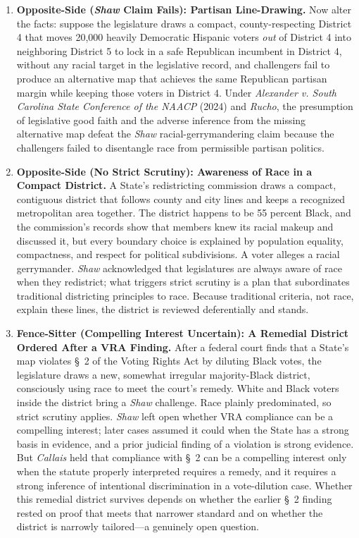 \documentclass[12pt]{article}
\begin{document}
\begin{enumerate}
\item \textbf{Opposite-Side (\textit{Shaw} Claim Fails): Partisan Line-Drawing.} Now alter the facts: suppose the legislature draws a compact, county-respecting District 4 that moves 20,000 heavily Democratic Hispanic voters \textit{out} of District 4 into neighboring District 5 to lock in a safe Republican incumbent in District 4, without any racial target in the legislative record, and challengers fail to produce an alternative map that achieves the same Republican partisan margin while keeping those voters in District 4. Under \textit{Alexander v. South Carolina State Conference of the NAACP} (2024) and \textit{Rucho}, the presumption of legislative good faith and the adverse inference from the missing alternative map defeat the \textit{Shaw} racial-gerrymandering claim because the challengers failed to disentangle race from permissible partisan politics.

\item \textbf{Opposite-Side (No Strict Scrutiny): Awareness of Race in a Compact District.} A State's redistricting commission draws a compact, contiguous district that follows county and city lines and keeps a recognized metropolitan area together. The district happens to be 55 percent Black, and the commission's records show that members knew its racial makeup and discussed it, but every boundary choice is explained by population equality, compactness, and respect for political subdivisions. A voter alleges a racial gerrymander. \textit{Shaw} acknowledged that legislatures are always aware of race when they redistrict; what triggers strict scrutiny is a plan that subordinates traditional districting principles to race. Because traditional criteria, not race, explain these lines, the district is reviewed deferentially and stands.

\item \textbf{Fence-Sitter (Compelling Interest Uncertain): A Remedial District Ordered After a VRA Finding.} After a federal court finds that a State's map violates \S~2 of the Voting Rights Act by diluting Black votes, the legislature draws a new, somewhat irregular majority-Black district, consciously using race to meet the court's remedy. White and Black voters inside the district bring a \textit{Shaw} challenge. Race plainly predominated, so strict scrutiny applies. \textit{Shaw} left open whether VRA compliance can be a compelling interest; later cases assumed it could when the State has a strong basis in evidence, and a prior judicial finding of a violation is strong evidence. But \textit{Callais} held that compliance with \S~2 can be a compelling interest only when the statute properly interpreted requires a remedy, and it requires a strong inference of intentional discrimination in a vote-dilution case. Whether this remedial district survives depends on whether the earlier \S~2 finding rested on proof that meets that narrower standard and on whether the district is narrowly tailored---a genuinely open question.

\end{enumerate}
\end{document}
